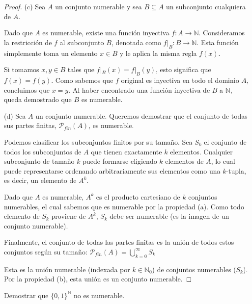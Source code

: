 \documentclass{article}
\theoremstyle{definition}
\newcommand{\N}{\mathbb{N}}
\newenvironment{ejercicio}[1]{\begin{trivlist}
\item[\hskip \labelsep {\bfseries Ejercicio}\hskip \labelsep {\bfseries #1.}]}{\end{trivlist}}
\begin{document}
\begin{proof}
    (c) Sea \(A\) un conjunto numerable y sea \(B \subseteq A\) un subconjunto cualquiera de \(A\).

    Dado que \(A\) es numerable, existe una función inyectiva \(f: A \to \N\).
    Consideramos la restricción de \(f\) al subconjunto \(B\), denotada como \(f|_B : B \to \N\). Esta función simplemente toma un elemento \(x \in B\) y le aplica la misma regla \(f(x)\).

    Si tomamos \(x, y \in B\) tales que \(f|_B(x) = f|_B(y)\), esto significa que \(f(x) = f(y)\). Como sabemos que \(f\) original es inyectiva en todo el dominio \(A\), concluimos que \(x = y\).
    Al haber encontrado una función inyectiva de \(B\) a \(\N\), queda demostrado que \(B\) es numerable.

    (d) Sea \(A\) un conjunto numerable. Queremos demostrar que el conjunto de todas sus partes finitas, \(\mathcal{P}_{fin}(A)\), es numerable.

    Podemos clasificar los subconjuntos finitos por su tamaño. Sea \(S_k\) el conjunto de todos los subconjuntos de \(A\) que tienen exactamente \(k\) elementos.
    Cualquier subconjunto de tamaño \(k\) puede formarse eligiendo \(k\) elementos de \(A\), lo cual puede representarse ordenando arbitrariamente sus elementos como una \(k\)-tupla, es decir, un elemento de \(A^k\).

    Dado que \(A\) es numerable, \(A^k\) es el producto cartesiano de \(k\) conjuntos numerables, el cual sabemos que es numerable por la propiedad (a). Como todo elemento de \(S_k\) proviene de \(A^k\), \(S_k\) debe ser numerable (es la imagen de un conjunto numerable).

    Finalmente, el conjunto de todas las partes finitas es la unión de todos estos conjuntos según su tamaño:
    \(\mathcal{P}_{fin}(A) = \bigcup_{k=0}^{\infty} S_k\)

    Esta es la unión numerable (indexada por \(k \in \N_0\)) de conjuntos numerables (\(S_k\)). Por la propiedad (b), esta unión es un conjunto numerable.

\end{proof}

\begin{ejercicio}{11}
    Demostrar que \( {\{0,1\}}^{\N} \) no es numerable.
\end{ejercicio}
\end{document}
